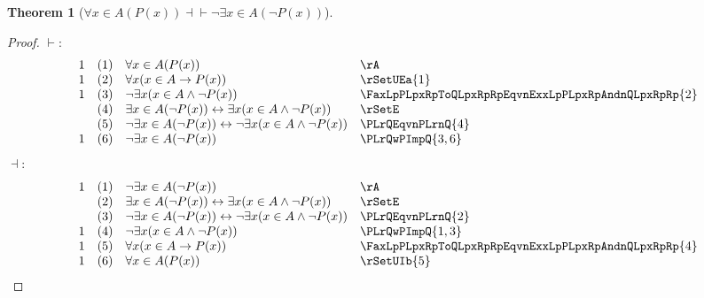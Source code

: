 \documentclass{book}
\theoremstyle{plain}
\newtheorem{theorem}{Theorem}
\theoremstyle{remark}
\theoremstyle{definition}
\begin{document}
\label{FaxInALpPLpxRpRpEqvnExxInALpnPLpxRpRp}
\begin{theorem}[\(\forall x \in A(P(x)) \dashv\vdash \neg\exists x \in A(\neg P(x))\)]
\end{theorem}
\begin{proof}
	\(\vdash:\)
	\[
	\begin{array}{llll}
		1 & (1) & \forall x \in A(P(x)) & \rA \\
		1 & (2) & \forall x(x \in A \rightarrow P(x)) & \rSetUEa{1} \\
		1 & (3) & \neg\exists x(x \in A \wedge \neg P(x)) &  \FaxLpPLpxRpToQLpxRpRpEqvnExxLpPLpxRpAndnQLpxRpRp{2} \\
		& (4) & \exists x \in A(\neg P(x)) \leftrightarrow \exists x(x \in A \wedge \neg P(x)) & \rSetE \\
		& (5) & \neg \exists x \in A(\neg P(x)) \leftrightarrow \neg \exists x(x \in A \wedge \neg P(x)) & \PLrQEqvnPLrnQ{4} \\
		1 & (6) & \neg \exists x \in A(\neg P(x)) & \PLrQwPImpQ{3,6} \\
	\end{array}
	\]
	\(\dashv:\)
	\[
	\begin{array}{llll}
		1 & (1) & \neg \exists x \in A(\neg P(x)) & \rA \\
		& (2) & \exists x \in A(\neg P(x)) \leftrightarrow \exists x(x \in A \wedge \neg P(x)) & \rSetE \\
		& (3) & \neg \exists x \in A(\neg P(x)) \leftrightarrow \neg \exists x(x \in A \wedge \neg P(x)) & \PLrQEqvnPLrnQ{2} \\
		1 & (4) & \neg \exists x(x \in A \wedge \neg P(x)) & \PLrQwPImpQ{1,3} \\
		1 & (5) & \forall x(x\in A\rightarrow P(x)) & \FaxLpPLpxRpToQLpxRpRpEqvnExxLpPLpxRpAndnQLpxRpRp{4} \\
		1 & (6) & \forall x\in A(P(x)) & \rSetUIb{5}\\
	\end{array}
	\]
\end{proof}
\end{document}
